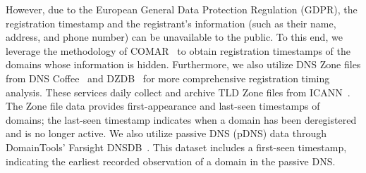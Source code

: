 However, due to the European General Data Protection Regulation (GDPR), the registration timestamp and the registrant's information (such as their name, address, and phone number) can be unavailable to the public.
To this end, we leverage the methodology of COMAR~\cite{maroofi2020comar} to obtain registration timestamps of the domains whose information is hidden.
Furthermore, we also utilize DNS Zone files from DNS Coffee~\cite{homeDNSC2:online} and DZDB~\cite{homeDZDB83:online} for more comprehensive registration timing analysis. 
These services daily collect and archive TLD Zone files from ICANN~\cite{AboutZon71:online}.
The Zone file data provides 
first-appearance and last-seen timestamps of domains; the last-seen timestamp indicates when a domain has been deregistered and is no longer active. 
We also utilize passive DNS (pDNS) data through DomainTools' Farsight DNSDB~\cite{Introduc45:online}. 
This dataset includes a first-seen timestamp, indicating the earliest recorded observation of a domain in the passive DNS.


